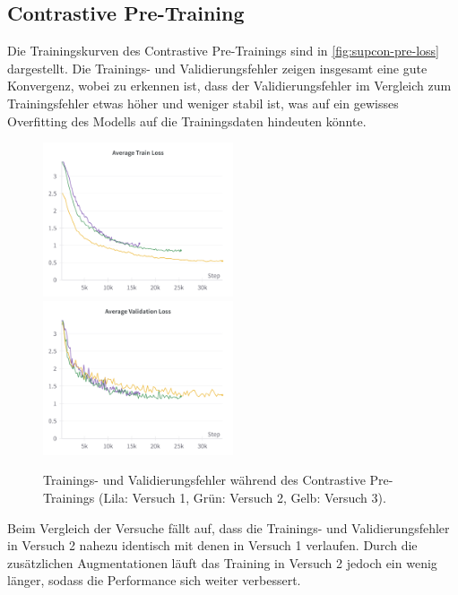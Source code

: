 \subsection{Contrastive Pre-Training} \label{subsec:supcon-pre-results}

Die Trainingskurven des Contrastive Pre-Trainings sind in \autoref{fig:supcon-pre-loss} dargestellt. Die Trainings- und Validierungsfehler zeigen insgesamt eine gute Konvergenz, wobei zu erkennen ist, dass der Validierungsfehler im Vergleich zum Trainingsfehler etwas höher und weniger stabil ist, was auf ein gewisses Overfitting des Modells auf die Trainingsdaten hindeuten könnte.

\begin{figure}[h]
	\centering
	\includegraphics[width=0.5\textwidth]{figure_results_supcon-pre_avg-train-loss.png}%
	\includegraphics[width=0.5\textwidth]{figure_results_supcon-pre_avg-val-loss.png}
	\caption[Trainings- und Validierungsfehler während des Contrastive Pre-Trainings.]{Trainings- und Validierungsfehler während des Contrastive Pre-Trainings (\textcolor{exp1}{Lila}: Versuch 1, \textcolor{exp2}{Grün}: Versuch 2, \textcolor{exp3}{Gelb}: Versuch 3).}
	\label{fig:supcon-pre-loss}
\end{figure}

Beim Vergleich der Versuche fällt auf, dass die Trainings- und Validierungsfehler in Versuch 2 nahezu identisch mit denen in Versuch 1 verlaufen. Durch die zusätzlichen Augmentationen läuft das Training in Versuch 2 jedoch ein wenig länger, sodass die Performance sich weiter verbessert.

